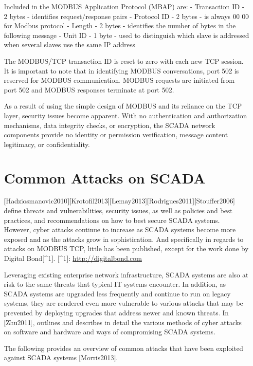 \documentclass[12pt,]{article}
\begin{document}
Included in the MODBUS Application Protocol (MBAP) are: - Transaction ID
- 2 bytes - identifies request/response pairs - Protocol ID - 2 bytes -
is always 00 00 for Modbus protocol - Length - 2 bytes - identifies the
number of bytes in the following message - Unit ID - 1 byte - used to
distinguish which slave is addressed when several slaves use the same IP
address

The MODBUS/TCP transaction ID is reset to zero with each new TCP
session. It is important to note that in identifying MODBUS
conversations, port 502 is reserved for MODBUS communication. MODBUS
requests are initiated from port 502 and MODBUS responses terminate at
port 502.

As a result of using the simple design of MODBUS and its reliance on the
TCP layer, security issues become apparent. With no authentication and
authorization mechanisms, data integrity checks, or encryption, the
SCADA network components provide no identity or permission verification,
message content legitimacy, or confidentiality.

\pagebreak

\section{Common Attacks on SCADA}\label{common-attacks-on-scada}

{[}Hadziosmanovic2010{]}{[}Krotofil2013{]}{[}Lemay2013{]}{[}Rodrigues2011{]}{[}Stouffer2006{]}
define threats and vulnerabilities, security issues, as well as policies
and best practices, and recommendations on how to best secure SCADA
systems. However, cyber attacks continue to increase as SCADA systems
become more exposed and as the attacks grow in sophistication. And
specifically in regards to attacks on MODBUS TCP, little has been
published, except for the work done by Digital Bond{[}\^{}1{]}.
{[}\^{}1{]}: \url{http://digitalbond.com}

Leveraging existing enterprise network infrastructure, SCADA systems are
also at risk to the same threats that typical IT systems encounter. In
addition, as SCADA systems are upgraded less frequently and continue to
run on legacy systems, they are rendered even more vulnerable to various
attacks that may be prevented by deploying upgrades that address newer
and known threats. In {[}Zhu2011{]}, outlines and describes in detail
the various methods of cyber attacks on software and hardware and ways
of compromising SCADA systems.

The following provides an overview of common attacks that have been
exploited against SCADA systems {[}Morris2013{]}.
\end{document}

